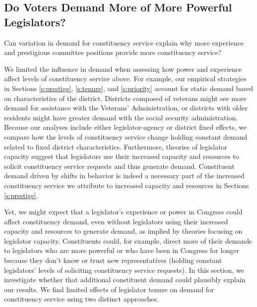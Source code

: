 \documentclass[12pt]{article}
\begin{document}


\subsection{Do Voters Demand More of More Powerful Legislators?}

Can variation in demand for constituency service explain why more experience and prestigious committee positions provide more constituency service? 

We limited the influence in demand when assessing how power and experience affect levels of constituency service above. For example, our empirical strategies in Sections \ref{s:prestige}, \ref{s:tenure}, and \ref{s:priority} account for static demand based on characteristics of the district. Districts composed of veterans might see more demand for assistance with the Veterans' Administration, or districts with older residents might have greater demand with the social security administration. Because our analyses include either legislator-agency or district fixed effects, we compare how the levels of constituency service change holding constant demand related to fixed district characteristics. Furthermore, theories of legislator capacity suggest that legislators use their increased capacity and resources to solicit constituency service requests and thus generate demand. Constituent demand driven by shifts in behavior is indeed a necessary part of the increased constituency service we attribute to increased capacity and resources in Sections \ref{s:prestige}.

Yet, we might expect that a legislator's experience or power in Congress could affect constituency demand, even without legislators using their increased capacity and resources to generate demand, as implied by theories focusing on legislator capacity. Constituents could, for example, direct more of their demands to legislators who are more powerful or who have been in Congress for longer because they don't know or trust new representatives (holding constant legislators' levels of soliciting constituency service requests). In this section, we investigate whether that additional constituent demand could plausibly explain our results. We find limited effects of legislator tenure on demand for constituency service using two distinct approaches. 
\end{document}
